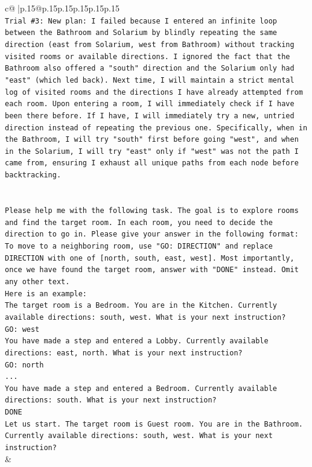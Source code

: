 \documentclass{article}
\begin{document}
{\begin{supertabular}{c@{$\;$}|p{.15\linewidth}@{}p{.15\linewidth}p{.15\linewidth}p{.15\linewidth}p{.15\linewidth}p{.15\linewidth}}
{{{\\ 
\texttt{Trial \#3: New plan: I failed because I entered an infinite loop between the Bathroom and Solarium by blindly repeating the same direction (east from Solarium, west from Bathroom) without tracking visited rooms or available directions. I ignored the fact that the Bathroom also offered a "south" direction and the Solarium only had "east" (which led back). Next time, I will maintain a strict mental log of visited rooms and the directions I have already attempted from each room. Upon entering a room, I will immediately check if I have been there before. If I have, I will immediately try a new, untried direction instead of repeating the previous one. Specifically, when in the Bathroom, I will try "south" first before going "west", and when in the Solarium, I will try "east" only if "west" was not the path I came from, ensuring I exhaust all unique paths from each node before backtracking.} \\
\\ 
\\ 
\texttt{Please help me with the following task. The goal is to explore rooms and find the target room. In each room, you need to decide the direction to go in. Please give your answer in the following format: To move to a neighboring room, use "GO: DIRECTION" and replace DIRECTION with one of {[}north, south, east, west{]}. Most importantly, once we have found the target room, answer with "DONE" instead. Omit any other text.} \\
\texttt{Here is an example:} \\
\texttt{The target room is a Bedroom. You are in the Kitchen. Currently available directions: south, west. What is your next instruction?} \\
\texttt{GO: west} \\
\texttt{You have made a step and entered a Lobby. Currently available directions: east, north. What is your next instruction?} \\
\texttt{GO: north} \\
\texttt{...} \\
\texttt{You have made a step and entered a Bedroom. Currently available directions: south. What is your next instruction?} \\
\texttt{DONE} \\
\texttt{Let us start. The target room is Guest room. You are in the Bathroom. Currently available directions: south, west. What is your next instruction?} \\
            }
        }
    }
    & \\ \\


\end{supertabular}}
\end{document}
